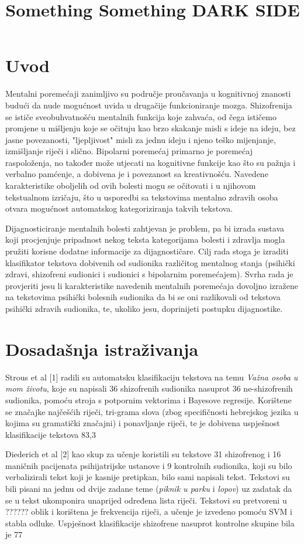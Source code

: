 \documentclass[10pt, a4paper]{article}
\title{Something Something DARK SIDE}
\begin{document}
\maketitleabstract

\section{Uvod}

Mentalni poremećaji zanimljivo su područje proučavanja u kognitivnoj znanosti budući da nude mogućnost uvida u drugačije funkcioniranje mozga. Shizofrenija se ističe sveobuhvatnošću mentalnih funkcija koje zahvaća, od čega ističemo promjene u mišljenju koje se očituju kao brzo skakanje misli s ideje na ideju, bez jasne povezanosti, "ljepljivost" misli za jednu ideju i njeno teško mijenjanje, izmišljanje riječi i slično. Bipolarni poremećaj primarno je poremećaj raspoloženja, no također može utjecati na kognitivne funkcije kao što su pažnja i verbalno pamćenje, a dobivena je i povezanost sa kreativnošću. Navedene karakteristike oboljelih od ovih bolesti mogu se očitovati i u njihovom tekstualnom izričaju, što u usporedbi sa tekstovima mentalno zdravih osoba otvara mogućnost automatskog kategoriziranja takvih tekstova. 

Dijagnosticiranje mentalnih bolesti zahtjevan je problem, pa bi izrada sustava koji procjenjuje pripadnost nekog teksta kategorijama bolesti i zdravlja mogla pružiti korisne dodatne informacije za dijagnostičare. Cilj rada stoga je izraditi klasifikator tekstova dobivenih od sudionika različitog mentalnog stanja (psihički zdravi, shizofreni sudionici i sudionici s bipolarnim poremećajem). Svrha rada je provjeriti jesu li karakteristike navedenih mentalnih poremećaja dovoljno izražene na tekstovima psihički bolesnih sudionika da bi se oni razlikovali od tekstova psihički zdravih sudionika, te, ukoliko jesu, doprinijeti postupku dijagnostike.

\section{Dosadašnja istraživanja}
Strous et al [1] radili su automatsku klasifikaciju tekstova na temu \emph{Važna osoba u mom životu}, koje su napisali 36 shizofrenih sudionika nasuprot 36 ne-shizofrenih sudionika, pomoću stroja s potpornim vektorima  i Bayesove regresije. Korištene se značajke najčešćih riječi, tri-grama slova (zbog specifičnosti hebrejskog jezika u kojima su gramatički značajni) i ponavljanje riječi, te je dobivena uspješnost klasifikacije tekstova 83,3%

Diederich et al [2] kao skup za učenje koristili su tekstove 31 shizofrenog i 16 maničnih pacijenata psihijatrijske ustanove i 9 kontrolnih sudionika, koji su bilo verbalizirali tekst koji je kasnije pretipkan, bilo sami napisali tekst. Tekstovi su bili pisani na jednu od dvije zadane teme (\emph{piknik u parku} i \emph{lopov}) uz zadatak da se u tekst ukomponira unaprijed određena lista riječi. Tekstovi su pretvoreni u ??????  oblik i korištena je frekvencija riječi, a učenje je izvedeno pomoću SVM i stabla odluke. Uspješnost klasifikacije shizofrene nasuprot kontrolne skupine bila je 77%
\end{document}
